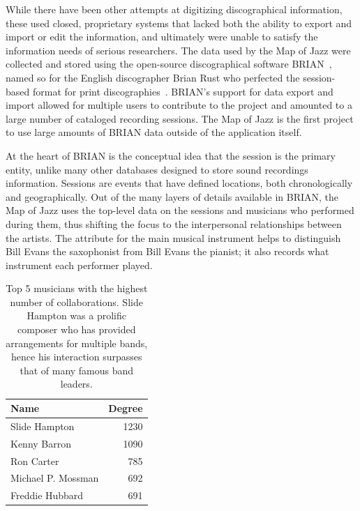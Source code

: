 \documentclass[12pt]{cmuthesis}
\begin{document}
  While there have been other attempts at digitizing discographical information,
  these used closed, proprietary systems that lacked both the ability to export
  and import or edit the information, and ultimately were unable to satisfy the
  information needs of serious researchers. The data used by the Map of Jazz were
  collected and stored using the open-source discographical software
  BRIAN~\cite{Albin}, named so for the English discographer Brian Rust who
  perfected the session-based format for print
  discographies~\cite{Rust1980,Rust2002}.
  BRIAN's support for data export and import allowed for
  multiple users to contribute to the project and amounted to a large number of
  cataloged recording sessions. The Map of Jazz is the first project to use large
  amounts of BRIAN data outside of the application itself.

  At the heart of BRIAN is the conceptual idea that the session is the
  primary entity, unlike many other databases designed to store sound recordings
  information. Sessions are events that have defined locations, both
  chronologically and geographically. Out of the many layers of details available
  in BRIAN, the Map of Jazz uses the top-level data on the sessions and musicians
  who performed during them, thus shifting the focus to the interpersonal
  relationships between the artists. The attribute for the main musical instrument
  helps to distinguish Bill Evans the saxophonist from Bill Evans the pianist; it
  also records what instrument each performer played.
  \begin{table}
    \centering
    \begin{tabular}{l  r}
    \toprule
    Name & Degree \\
    \midrule
    Slide Hampton & 1230\\
    Kenny Barron & 1090\\
    Ron Carter & 785\\
    Michael P. Mossman & 692\\
    Freddie Hubbard & 691\\
    \bottomrule
    \end{tabular}
    \caption{Top 5 musicians with the highest number of collaborations. Slide
    Hampton was a prolific composer who has provided arrangements for multiple
    bands, hence his interaction surpasses that of many famous band leaders.}
    \label{tab:high_degree}
  \end{table}
\end{document}
